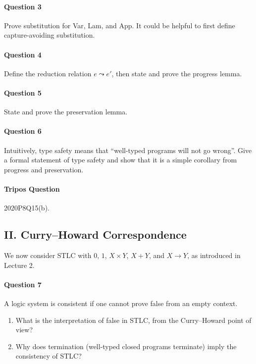 \documentclass[11pt,a4paper,twoside]{article}
\begin{document}
\paragraph{Question 3} Prove substitution for Var, Lam, and App.
It could be helpful to first define capture-avoiding substitution.

\paragraph{Question 4} Define the reduction relation $e \leadsto e'$, then state and prove the progress lemma.

\paragraph{Question 5} State and prove the preservation lemma.

\paragraph{Question 6} Intuitively, type safety means that ``well-typed programs will not go wrong''. Give a formal statement of type safety and show that it is a simple corollary from progress and preservation.

\paragraph{Tripos Question} 2020P8Q15(b).

\subsection*{II. Curry--Howard Correspondence}

We now consider STLC with $0$, $1$, $X \times Y$, $X + Y$, and $X \to Y$, as introduced in Lecture 2.

\paragraph{Question 7} A logic system is consistent if one cannot prove false from an empty context. 
\begin{enumerate}[label=(\alph*)]
  \item What is the interpretation of false in STLC, from the Curry--Howard point of view? 
  \item Why does termination (well-typed closed programs terminate) imply the consistency of STLC?
\end{enumerate}
\end{document}
